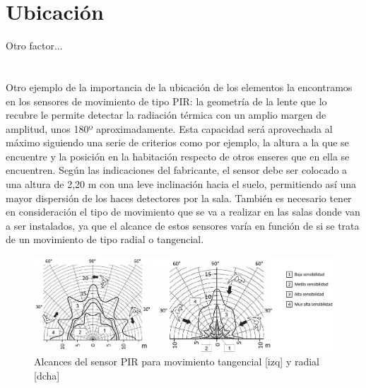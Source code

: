 \section{Ubicación}

Otro factor...\\\\\\
Otro ejemplo de la importancia de la ubicación de los elementos la encontramos en los sensores de movimiento de tipo PIR: la geometría de la lente que lo recubre le permite detectar la radiación térmica con un amplio margen de amplitud, unos 180º aproximadamente. Esta capacidad será aprovechada al máximo siguiendo una serie de criterios como por ejemplo, la altura a la que se encuentre y la posición en la habitación respecto de otros enseres que en ella se encuentren. Según las indicaciones del fabricante, el sensor debe ser colocado a una altura de 2,20 m con una leve inclinación hacia el suelo, permitiendo así una mayor dispersión de los haces detectores por la sala. También es necesario tener en consideración el tipo de movimiento que se va a realizar en las salas donde van a ser instalados, ya que el alcance de estos sensores varía en función de si se trata de un movimiento de tipo radial o tangencial.
\begin{figure}[h]
\includegraphics[width=1.15\textwidth]{figures/alcance_PIR.png}   
\caption{Alcances del sensor PIR para movimiento tangencial [izq] y radial [dcha]}
\label{fig:alcance_PIR}
\end{figure}

